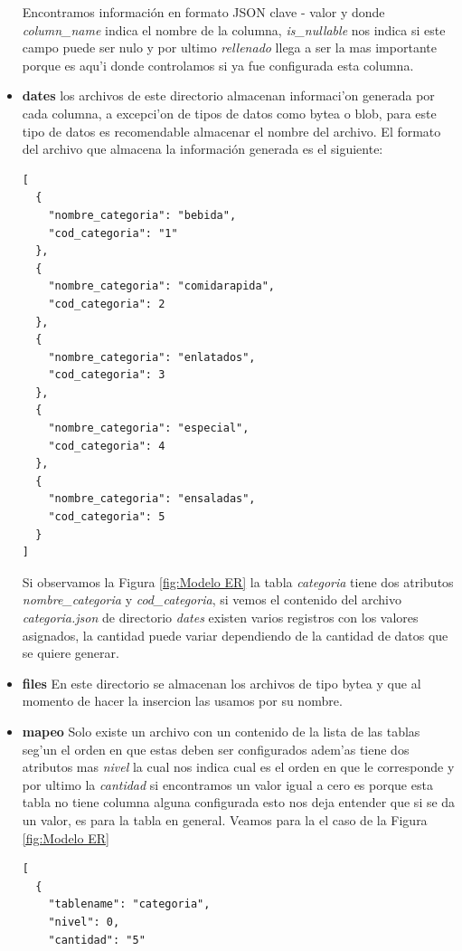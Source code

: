 \begin{itemize}
Encontramos informaci\'on en formato JSON clave - valor y donde \textit{column\_name} indica el nombre de la columna, \textit{is\_nullable} nos indica si este campo puede ser nulo y por ultimo \textit{rellenado} llega a ser la mas importante porque es aqu'i donde controlamos si ya fue configurada esta columna.
\item \textbf{dates} los archivos de este directorio almacenan informaci'on generada por cada columna, a excepci'on de tipos de datos como bytea o blob, para este tipo de datos es recomendable almacenar el nombre del archivo. El formato del archivo que almacena la informaci\'on generada es el siguiente:
\lstset{language=java,breaklines=true}
\label{tablaCompraProductoArchivoControl}
\begin{lstlisting}
[
  {
    "nombre_categoria": "bebida",
    "cod_categoria": "1"
  },
  {
    "nombre_categoria": "comidarapida",
    "cod_categoria": 2
  },
  {
    "nombre_categoria": "enlatados",
    "cod_categoria": 3
  },
  {
    "nombre_categoria": "especial",
    "cod_categoria": 4
  },
  {
    "nombre_categoria": "ensaladas",
    "cod_categoria": 5
  }
]
\end{lstlisting}
Si observamos la Figura \ref{fig:Modelo ER} la tabla \textit{categoria} tiene dos atributos \textit{nombre\_categoria} y \textit{cod\_categoria}, si vemos el contenido del archivo \textit{categoria.json} de directorio \textit{dates} existen varios registros con los valores asignados, la cantidad puede variar dependiendo de la cantidad de datos que se quiere generar.
 \item \textbf{files} En este directorio se almacenan los archivos de tipo bytea y que al momento de hacer la insercion las usamos por su nombre.
 \item \textbf{mapeo} Solo existe un archivo con un contenido de la lista de las tablas seg'un el orden en que estas deben ser configurados adem'as tiene dos atributos mas \textit{nivel} la cual nos indica cual es el orden en que le corresponde y por ultimo la \textit{cantidad} si encontramos un valor igual a cero es porque esta tabla no tiene columna alguna configurada esto nos deja entender que si se da un valor, es para la tabla en general. Veamos para la el caso de la Figura \ref{fig:Modelo ER}
\lstset{language=java,breaklines=true}
\label{tablaCompraProductoArchivoControl}
\begin{lstlisting}
[
  {
    "tablename": "categoria",
    "nivel": 0,
    "cantidad": "5"

\end{lstlisting}
\end{itemize}
